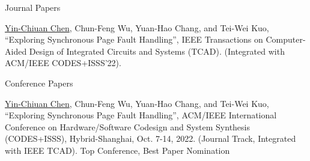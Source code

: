 

\begin{cventries}

  \cvpub
    {Journal Papers}
    {
      \begin{cvitems}
        \item {\underline{Yin-Chiuan Chen}, Chun-Feng Wu, Yuan-Hao Chang, and Tei-Wei Kuo, “Exploring Synchronous Page Fault Handling”, IEEE Transactions on Computer-Aided Design of Integrated Circuits and Systems (TCAD). (Integrated with ACM/IEEE CODES+ISSS’22).}
      \end{cvitems}
    }

  \cvpub
    {Conference Papers}
    {
      \begin{cvitems}
        \item {\underline{Yin-Chiuan Chen}, Chun-Feng Wu, Yuan-Hao Chang, and Tei-Wei Kuo, “Exploring Synchronous Page Fault Handling”, ACM/IEEE International Conference on Hardware/Software Codesign and System Synthesis (CODES+ISSS), Hybrid-Shanghai, Oct. 7-14, 2022. (Journal Track, Integrated with IEEE TCAD). Top Conference, Best Paper Nomination }
      \end{cvitems}
    }

\end{cventries}